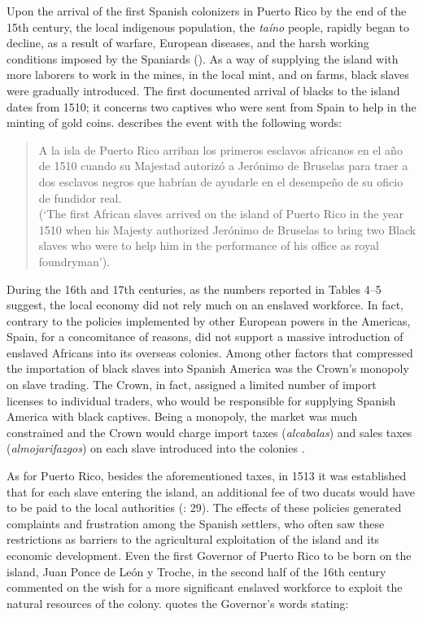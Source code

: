 \documentclass[output=paper,colorlinks,citecolor=brown]{langscibook}
\begin{document}
Upon the arrival of the first Spanish colonizers in Puerto Rico by the end of the 15th century, the local indigenous population, the \textit{taíno} people, rapidly began to decline, as a result of warfare, European diseases, and the harsh working conditions imposed by the Spaniards (\citealt{Rouse1994,Brinton1997,Bernárdez2009}). As a way of supplying the island with more laborers to work in the mines, in the local mint, and on farms, black slaves were gradually introduced. The first documented arrival of blacks to the island dates from 1510; it concerns two captives who were sent from Spain to help in the minting of gold coins. \citet[30]{Díaz-Soler1974} describes the event with the following words:

\begin{quote}
A la isla de Puerto Rico arriban los primeros esclavos africanos en el año de 1510 cuando su Majestad autorizó a Jerónimo de Bruselas para traer a dos esclavos negros que habrían de ayudarle en el desempeño de su oficio de fundidor real.\\
(`The first African slaves arrived on the island of Puerto Rico in the year 1510 when his Majesty authorized Jerónimo de Bruselas to bring two Black slaves who were to help him in the performance of his office as royal foundryman').
\end{quote}

During the 16th and 17th centuries, as the numbers reported in Tables 4--5 suggest, the local economy did not rely much on an enslaved workforce. In fact, contrary to the policies implemented by other European powers in the Americas, Spain, for a concomitance of reasons, did not support a massive introduction of enslaved Africans into its overseas colonies. Among other factors that compressed the importation of black slaves into Spanish America was the Crown’s monopoly on slave trading. The Crown, in fact, assigned a limited number of import licenses to individual traders, who would be responsible for supplying Spanish America with black captives. Being a monopoly, the market was much constrained and the Crown would charge import taxes (\textit{alcabalas}) and sales taxes (\textit{almojarifazgos}) on each slave introduced into the colonies \citep{Palmer1976}. 

As for Puerto Rico, besides the aforementioned taxes, in 1513 it was established that for each slave entering the island, an additional fee of two ducats would have to be paid to the local authorities (\citealt{AlvarezNazario1974}: 29). The effects of these policies generated complaints and frustration among the Spanish settlers, who often saw these restrictions as barriers to the agricultural exploitation of the island and its economic development. Even the first Governor of Puerto Rico to be born on the island, Juan Ponce de León y Troche, in the second half of the 16th century commented on the wish for a more significant enslaved workforce to exploit the natural resources of the colony. \citet[487]{Tió1961} quotes the Governor’s words stating:
\end{document}

